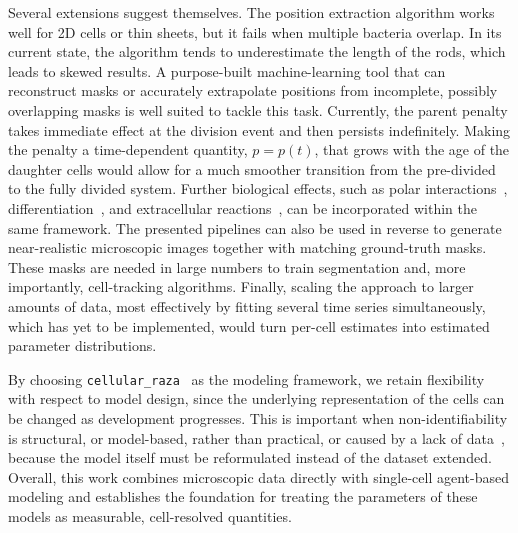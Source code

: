Several extensions suggest themselves.
The position extraction algorithm works well for 2D cells or thin sheets, but it fails when multiple
bacteria overlap.
In its current state, the algorithm tends to underestimate the length of the rods, which leads to
skewed results.
A purpose-built machine-learning tool that can reconstruct masks or accurately extrapolate positions
from incomplete, possibly overlapping masks is well suited to tackle this task.
Currently, the parent penalty takes immediate effect at the division event and then persists
indefinitely.
Making the penalty a time-dependent quantity, $p = p(t)$, that grows with the age of the daughter
cells would allow for a much smoother transition from the pre-divided to the fully divided system.
Further biological effects, such as polar interactions~\cite{Duvernoy2018},
differentiation~\cite{vanGestel2015}, and extracellular reactions~\cite{Li2025}, can be incorporated
within the same framework.
The presented pipelines can also be used in reverse to generate near-realistic microscopic images
together with matching ground-truth masks.
These masks are needed in large numbers to train segmentation and, more importantly, cell-tracking
algorithms.
Finally, scaling the approach to larger amounts of data, most effectively by fitting several time
series simultaneously, which has yet to be implemented, would turn per-cell estimates into estimated
parameter distributions.

By choosing \texttt{cellular\_raza}~\cite{Pleyer2025} as the modeling framework, we retain
flexibility with respect to model design, since the underlying representation of the cells can be
changed as development progresses.
This is important when non-identifiability is structural, or model-based, rather than practical, or
caused by a lack of data~\cite{Heinrich2025}, because the model itself must be reformulated instead
of the dataset extended.
Overall, this work combines microscopic data directly with single-cell agent-based modeling and
establishes the foundation for treating the parameters of these models as measurable, cell-resolved
quantities.
